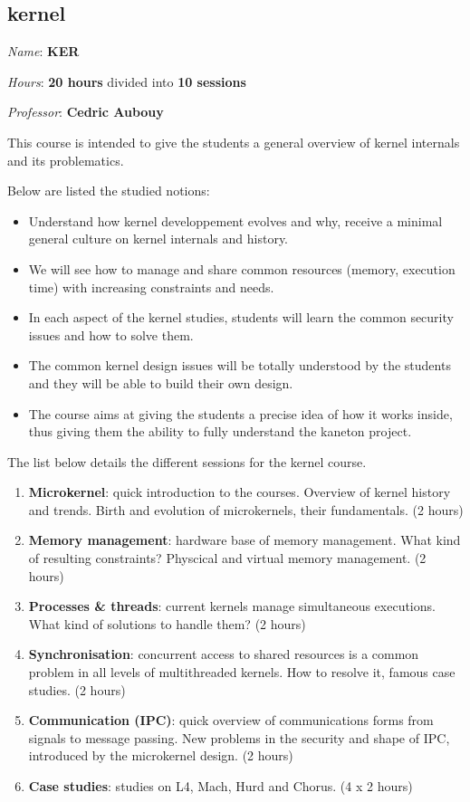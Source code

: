 \begin{multicols}{2}
%
%

\section{kernel}

\textit{Name}: \textbf{KER}

\textit{Hours}: \textbf{20 hours} divided into \textbf{10 sessions}

\textit{Professor}: \textbf{Cedric Aubouy}

This course is intended to give the students a general overview of
kernel internals and its problematics.

Below are listed the studied notions:

\begin{itemize}
  \item
    Understand how kernel developpement evolves and why, receive a
    minimal general culture on kernel internals and history.
  \item
    We will see how to manage and share common resources (memory,
    execution time) with increasing constraints and needs.
  \item
    In each aspect of the kernel studies, students will learn the
    common security issues and how to solve them.
  \item
    The common kernel design issues will be totally understood by the
    students and they will be able to build their own design.
  \item
    The course aims at giving the students a precise idea of how it
    works inside, thus giving them the ability to fully understand
    the kaneton project.
\end{itemize}

The list below details the different sessions for the kernel course.

\begin{enumerate}
  \item
    \textbf{Microkernel}: quick introduction to the courses. Overview
    of kernel history and trends. Birth and evolution of microkernels, their
    fundamentals. (2 hours)
  \item
    \textbf{Memory management}: hardware base of memory management. What
    kind of resulting constraints? Physcical and virtual memory
    management. (2 hours)
  \item
    \textbf{Processes \& threads}: current kernels manage simultaneous
    executions. What kind of solutions to handle them? (2 hours)
  \item
    \textbf{Synchronisation}: concurrent access to shared resources is a
    common problem in all levels of multithreaded kernels. How to resolve it,
    famous case studies. (2 hours)
  \item
    \textbf{Communication (IPC)}: quick overview of communications forms
    from signals to message passing. New problems in the security and shape of
    IPC, introduced by the microkernel design. (2 hours)
  \item
    \textbf{Case studies}: studies on L4, Mach, Hurd and Chorus. (4 x 2 hours)
\end{enumerate}


\end{multicols}
